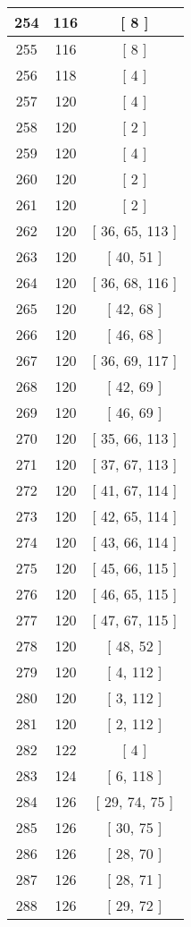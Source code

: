 \begin{center}
\begin{longtable}[H]{|| c c c ||}
\hline
254 & 116 & [ 8 ] \\ 
\hline
255 & 116 & [ 8 ] \\ 
\hline
256 & 118 & [ 4 ] \\ 
\hline
257 & 120 & [ 4 ] \\ 
\hline
258 & 120 & [ 2 ] \\ 
\hline
259 & 120 & [ 4 ] \\ 
\hline
260 & 120 & [ 2 ] \\ 
\hline
261 & 120 & [ 2 ] \\ 
\hline
262 & 120 & [ 36, 65, 113 ] \\ 
\hline
263 & 120 & [ 40, 51 ] \\ 
\hline
264 & 120 & [ 36, 68, 116 ] \\ 
\hline
265 & 120 & [ 42, 68 ] \\ 
\hline
266 & 120 & [ 46, 68 ] \\ 
\hline
267 & 120 & [ 36, 69, 117 ] \\ 
\hline
268 & 120 & [ 42, 69 ] \\ 
\hline
269 & 120 & [ 46, 69 ] \\ 
\hline
270 & 120 & [ 35, 66, 113 ] \\ 
\hline
271 & 120 & [ 37, 67, 113 ] \\ 
\hline
272 & 120 & [ 41, 67, 114 ] \\ 
\hline
273 & 120 & [ 42, 65, 114 ] \\ 
\hline
274 & 120 & [ 43, 66, 114 ] \\ 
\hline
275 & 120 & [ 45, 66, 115 ] \\ 
\hline
276 & 120 & [ 46, 65, 115 ] \\ 
\hline
277 & 120 & [ 47, 67, 115 ] \\ 
\hline
278 & 120 & [ 48, 52 ] \\ 
\hline
279 & 120 & [ 4, 112 ] \\ 
\hline
280 & 120 & [ 3, 112 ] \\ 
\hline
281 & 120 & [ 2, 112 ] \\ 
\hline
282 & 122 & [ 4 ] \\ 
\hline
283 & 124 & [ 6, 118 ] \\ 
\hline
284 & 126 & [ 29, 74, 75 ] \\ 
\hline
285 & 126 & [ 30, 75 ] \\ 
\hline
286 & 126 & [ 28, 70 ] \\ 
\hline
287 & 126 & [ 28, 71 ] \\ 
\hline
288 & 126 & [ 29, 72 ] \\ 

\end{longtable}
\end{center}
